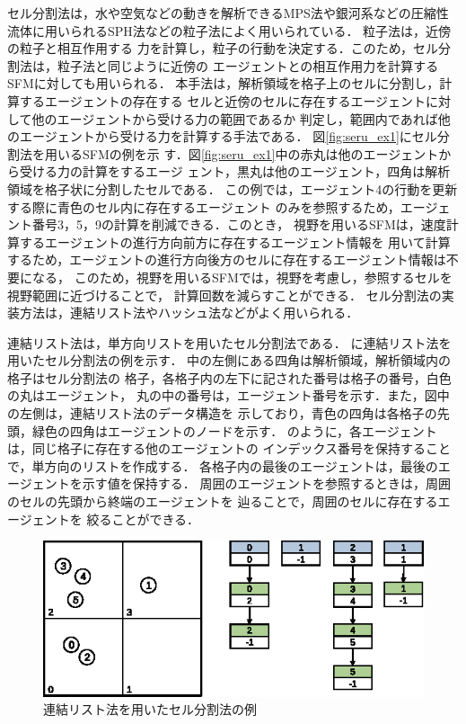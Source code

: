 セル分割法は，水や空気などの動きを解析できるMPS法\cite{mps}や銀河系などの圧縮性
流体に用いられるSPH法\cite{sph}などの粒子法によく用いられている．
粒子法は，近傍の粒子と相互作用する
力を計算し，粒子の行動を決定する．このため，セル分割法は，粒子法と同じように近傍の
エージェントとの相互作用力を計算するSFMに対しても用いられる．
本手法は，解析領域を格子上のセルに分割し，計算するエージェントの存在する
セルと近傍のセルに存在するエージェントに対して他のエージェントから受ける力の範囲であるか
判定し，範囲内であれば他のエージェントから受ける力を計算する手法である．
図\ref{fig:seru_ex1}にセル分割法を用いるSFMの例を示
す．図\ref{fig:seru_ex1}中の赤丸は他のエージェントから受ける力の計算をするエージ
ェント，黒丸は他のエージェント，四角は解析領域を格子状に分割したセルである．
この例では，エージェント4の行動を更新する際に青色のセル内に存在するエージェント
のみを参照するため，エージェント番号3，5，9の計算を削減できる．このとき，
視野を用いるSFMは，速度計算するエージェントの進行方向前方に存在するエージェント情報を
用いて計算するため，エージェントの進行方向後方のセルに存在するエージェント情報は不要になる，
このため，視野を用いるSFMでは，視野を考慮し，参照するセルを視野範囲に近づけることで，
計算回数を減らすことができる．
セル分割法の実装方法は，連結リスト法やハッシュ法などがよく用いられる\cite{cell1}\cite{cell2}．

連結リスト法は，単方向リストを用いたセル分割法である．
に連結リスト法を用いたセル分割法の例を示す．
中の左側にある四角は解析領域，解析領域内の格子はセル分割法の
格子，各格子内の左下に記された番号は格子の番号，白色の丸はエージェント，
丸の中の番号は，エージェント番号を示す．また，図中の左側は，連結リスト法のデータ構造を
示しており，青色の四角は各格子の先頭，緑色の四角はエージェントのノードを示す．
のように，各エージェントは，同じ格子に存在する他のエージェントの
インデックス番号を保持することで，単方向のリストを作成する．
各格子内の最後のエージェントは，最後のエージェントを示す値を保持する．
周囲のエージェントを参照するときは，周囲のセルの先頭から終端のエージェントを
辿ることで，周囲のセルに存在するエージェントを
絞ることができる．

\begin{figure}[t]
 \begin{center}
  \includegraphics[width=11.5cm,clip]{figure/serubunkatu_serurinku.eps}
  \caption{連結リスト法を用いたセル分割法の例}
  \label{fig:renketu_list}
 \end{center}
\end{figure}

